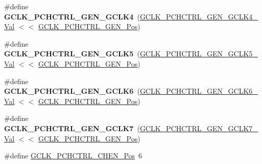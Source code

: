 \begin{DoxyCompactItemize}
\item 
\hypertarget{group___s_a_m_l21___g_c_l_k_ga3877a78d780e68a00298e2c6a5ae6cda}{}\#define {\bfseries G\+C\+L\+K\+\_\+\+P\+C\+H\+C\+T\+R\+L\+\_\+\+G\+E\+N\+\_\+\+G\+C\+L\+K4}~(\hyperlink{group___s_a_m_l21___g_c_l_k_gaced1a57c09e580b2f53d95b87fda8da1}{G\+C\+L\+K\+\_\+\+P\+C\+H\+C\+T\+R\+L\+\_\+\+G\+E\+N\+\_\+\+G\+C\+L\+K4\+\_\+\+Val}    $<$$<$ \hyperlink{group___s_a_m_l21___g_c_l_k_ga43f3e8ba61616cbd7885f4c9ebfb5942}{G\+C\+L\+K\+\_\+\+P\+C\+H\+C\+T\+R\+L\+\_\+\+G\+E\+N\+\_\+\+Pos})\label{group___s_a_m_l21___g_c_l_k_ga3877a78d780e68a00298e2c6a5ae6cda}

\item 
\hypertarget{group___s_a_m_l21___g_c_l_k_ga50db8ad67d2b03c6d0f0dd031764efa3}{}\#define {\bfseries G\+C\+L\+K\+\_\+\+P\+C\+H\+C\+T\+R\+L\+\_\+\+G\+E\+N\+\_\+\+G\+C\+L\+K5}~(\hyperlink{group___s_a_m_l21___g_c_l_k_ga24712f106984f02229f430f6937212c0}{G\+C\+L\+K\+\_\+\+P\+C\+H\+C\+T\+R\+L\+\_\+\+G\+E\+N\+\_\+\+G\+C\+L\+K5\+\_\+\+Val}    $<$$<$ \hyperlink{group___s_a_m_l21___g_c_l_k_ga43f3e8ba61616cbd7885f4c9ebfb5942}{G\+C\+L\+K\+\_\+\+P\+C\+H\+C\+T\+R\+L\+\_\+\+G\+E\+N\+\_\+\+Pos})\label{group___s_a_m_l21___g_c_l_k_ga50db8ad67d2b03c6d0f0dd031764efa3}

\item 
\hypertarget{group___s_a_m_l21___g_c_l_k_ga50b8a761565e434f3c53c6f8e36f728d}{}\#define {\bfseries G\+C\+L\+K\+\_\+\+P\+C\+H\+C\+T\+R\+L\+\_\+\+G\+E\+N\+\_\+\+G\+C\+L\+K6}~(\hyperlink{group___s_a_m_l21___g_c_l_k_gae698cff036e8050049f6cb94ef9a0ad0}{G\+C\+L\+K\+\_\+\+P\+C\+H\+C\+T\+R\+L\+\_\+\+G\+E\+N\+\_\+\+G\+C\+L\+K6\+\_\+\+Val}    $<$$<$ \hyperlink{group___s_a_m_l21___g_c_l_k_ga43f3e8ba61616cbd7885f4c9ebfb5942}{G\+C\+L\+K\+\_\+\+P\+C\+H\+C\+T\+R\+L\+\_\+\+G\+E\+N\+\_\+\+Pos})\label{group___s_a_m_l21___g_c_l_k_ga50b8a761565e434f3c53c6f8e36f728d}

\item 
\hypertarget{group___s_a_m_l21___g_c_l_k_gad984487b01a032c2b79ffd24015b15b5}{}\#define {\bfseries G\+C\+L\+K\+\_\+\+P\+C\+H\+C\+T\+R\+L\+\_\+\+G\+E\+N\+\_\+\+G\+C\+L\+K7}~(\hyperlink{group___s_a_m_l21___g_c_l_k_gae2a70517fe25b2bc24f79e84c2c160b0}{G\+C\+L\+K\+\_\+\+P\+C\+H\+C\+T\+R\+L\+\_\+\+G\+E\+N\+\_\+\+G\+C\+L\+K7\+\_\+\+Val}    $<$$<$ \hyperlink{group___s_a_m_l21___g_c_l_k_ga43f3e8ba61616cbd7885f4c9ebfb5942}{G\+C\+L\+K\+\_\+\+P\+C\+H\+C\+T\+R\+L\+\_\+\+G\+E\+N\+\_\+\+Pos})\label{group___s_a_m_l21___g_c_l_k_gad984487b01a032c2b79ffd24015b15b5}

\item 
\hypertarget{group___s_a_m_l21___g_c_l_k_ga1d6fc43d161c655dc5a7d49ef81e006a}{}\#define \hyperlink{group___s_a_m_l21___g_c_l_k_ga1d6fc43d161c655dc5a7d49ef81e006a}{G\+C\+L\+K\+\_\+\+P\+C\+H\+C\+T\+R\+L\+\_\+\+C\+H\+E\+N\+\_\+\+Pos}~6\label{group___s_a_m_l21___g_c_l_k_ga1d6fc43d161c655dc5a7d49ef81e006a}


\end{DoxyCompactItemize}
